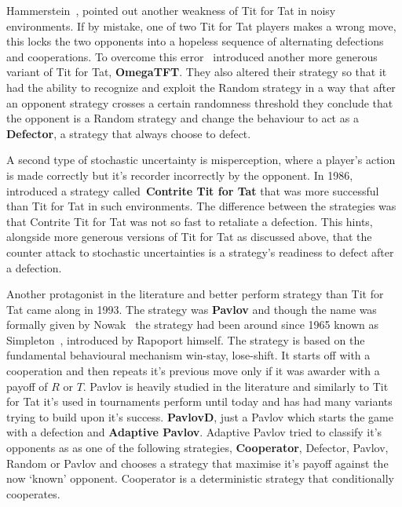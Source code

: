 \documentclass{article}
\theoremstyle{definition}
\begin{document}
Hammerstein~\cite{Hammerstein1984}, pointed out another weakness of Tit
for Tat in noisy environments. If by mistake, one of two Tit for Tat players makes a wrong move,
this locks the two opponents into a hopeless sequence of alternating defections
and cooperations. To overcome this error~\cite{Wolfgang2006} introduced another more
generous variant of Tit for Tat, \textbf{OmegaTFT}. They also altered their strategy
so that it had the ability
to recognize and exploit the Random strategy in a way that after an opponent
strategy crosses a certain randomness threshold they conclude that the opponent is
a Random strategy and change the behaviour to act as a \textbf{Defector}, a strategy that
always choose to defect.

A second type of stochastic uncertainty is misperception, where a player's action is made correctly
but it's recorder incorrectly by the opponent. In 1986,~\cite{Sugden2004} introduced
a strategy called~\textbf{Contrite Tit for Tat} that was more successful than Tit
for Tat in such environments. The difference between the strategies was that
Contrite Tit for Tat was not so fast to retaliate a defection. This hints, alongside
more generous versions of Tit for Tat as discussed above, that the counter attack
to stochastic uncertainties is a strategy's readiness to defect after a defection.

Another protagonist in the literature and better perform strategy than Tit for Tat
came along in 1993. The strategy was \textbf{Pavlov} and though the name was
formally given  by Nowak~\cite{Nowak1993} the strategy had been around since 1965
known as Simpleton~\cite{rapoport1965}, introduced by Rapoport himself.
The strategy is based on the fundamental
behavioural mechanism win-stay, lose-shift. It starts off with a cooperation and
then repeats it's previous move only if it was awarder with a payoff of \(R\) or
\(T\). Pavlov is heavily studied in the literature and similarly to Tit for Tat
it's used in tournaments perform until today and has had many variants trying
to build upon it's success. \textbf{PavlovD}, just a Pavlov which starts the game
with a defection and \textbf{Adaptive Pavlov}. Adaptive Pavlov tried to
classify it's opponents as as one of the following strategies, \textbf{Cooperator}, Defector,
Pavlov, Random or Pavlov and chooses a strategy that maximise it's payoff against
the now `known' opponent.
Cooperator is a deterministic strategy that conditionally cooperates.
\end{document}
